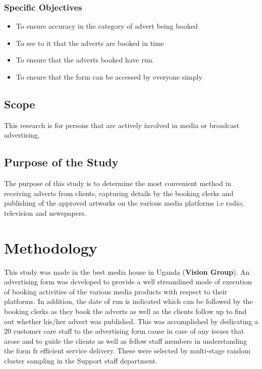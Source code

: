 \documentclass[options]{article}
\begin{document}
\subsubsection{\textbf{Specific Objectives}}

\begin{itemize}
\item To ensure accuracy in the category of advert being booked
\item To see to it that the adverts are booked in time
  \item To ensure that the adverts booked have run.
  \item To ensure that the form can be accessed by everyone simply
\end{itemize}


\subsection{\textbf{Scope}}
This research is for persons that are actively involved in media or broadcast advertising.

\subsection{\textbf{Purpose of the Study}}
The purpose of this study is to determine the most convenient method in receiving adverts from clients, capturing details by the booking clerks and publishing of the approved artworks on the various media platforms i.e radio, television and newspapers.


\section{\textbf{Methodology}}
This study was made in the best media house in Uganda (\textbf{Vision Group}). An advertising form was developed to provide a well streamlined mode of execution of booking activities of the various media products with respect to their platforms. In addition, the date of run is indicated which can be followed by the booking clerks as they book the adverts as well as the clients follow up to find out whether his/her advert was published. This was accomplished by dedicating a 20 customer care staff to the advertising form cause in case of any issues that arose and to guide the clients as well as fellow staff members  in understanding the form fr efficient service delivery. These were selected by multi-stage random cluster sampling in the Support staff department.
\end{document}
